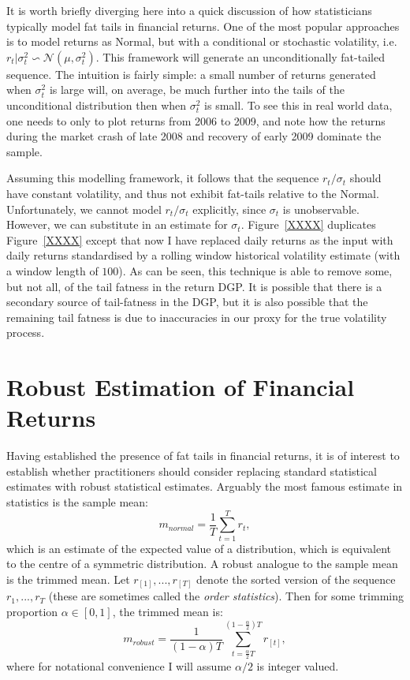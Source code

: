 \documentclass[12pt,a4paper]{amsart}
\renewcommand{\a}{\alpha}
\newcommand{\m}{\mu}
\newcommand{\s}{\sigma}
\newcommand{\N}{\mathcal{N}}							%
\begin{document}
It is worth briefly diverging here into a quick discussion of how statisticians typically model fat tails in financial returns. One of the most popular approaches is to model returns as Normal, but with a conditional or stochastic volatility, i.e. $r_t | \s_t^2 \backsim \N(\m, \s_t^2)$. This framework will generate an unconditionally fat-tailed sequence. The intuition is fairly simple: a small number of returns generated when $\s_t^2$ is large will, on average, be much further into the tails of the unconditional distribution then when $\s_t^2$ is small. To see this in real world data, one needs to only to plot returns from 2006 to 2009, and note how the returns during the market crash of late 2008 and recovery of early 2009 dominate the sample.

Assuming this modelling framework, it follows that the sequence $r_t / \s_t$ should have constant volatility, and thus not exhibit fat-tails relative to the Normal. Unfortunately, we cannot model $r_t / \s_t$ explicitly, since $\s_t$ is unobservable. However, we can substitute in an estimate for $\s_t$. Figure~\ref{XXXX} duplicates Figure~\ref{XXXX} except that now I have replaced daily returns as the input with daily returns standardised by a rolling window historical volatility estimate (with a window length of $100$). As can be seen, this technique is able to remove some, but not all, of the tail fatness in the return DGP. It is possible that there is a secondary source of tail-fatness in the DGP, but it is also possible that the remaining tail fatness is due to inaccuracies in our proxy for the true volatility process.



\section{Robust Estimation of Financial Returns}\label{secFinReturnTailFatness}

Having established the presence of fat tails in financial returns, it is of interest to establish whether practitioners should consider replacing standard statistical estimates with robust statistical estimates. Arguably the most famous estimate in statistics is the sample mean:
\begin{equation}
m_{normal} = \frac{1}{T} \sum_{t=1}^T r_t ,
\end{equation}
which is an estimate of the expected value of a distribution, which is equivalent to the centre of a symmetric distribution. A robust analogue to the sample mean is the trimmed mean. Let $r_{[1]}, ..., r_{[T]}$ denote the sorted version of the sequence $r_1, ..., r_T$ (these are sometimes called the \emph{order statistics}). Then for some trimming proportion $\a \in [0, 1]$, the trimmed mean is:
\begin{equation}
m_{robust} = \frac{1}{(1 - \a) T} \sum_{t=\frac{\a}{2} T}^{(1 - \frac{\a}{2}) T} r_{[t]} ,
\end{equation}
where for notational convenience I will assume $\a / 2$ is integer valued.
\end{document}
